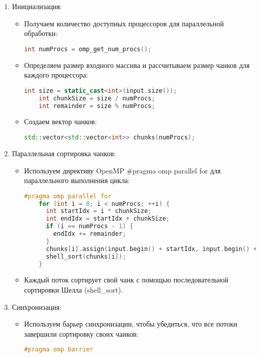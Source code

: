 \documentclass[]{article}
\theoremstyle{remark}
\theoremstyle{definition}
\newcommand{\cpp}{\textit{}}
\begin{document}
\begin{enumerate}
    \item Инициализация:
    \begin{itemize}
        \item Получаем количество доступных процессоров для параллельной обработки:
        \begin{lstlisting}[language=C++]
    int numProcs = omp_get_num_procs();
        \end{lstlisting}

        \item Определяем размер входного массива и рассчитываем размер чанков для каждого процессора:
        \begin{lstlisting}[language=C++]
    int size = static_cast<int>(input.size());
    int chunkSize = size / numProcs;
    int remainder = size % numProcs;
        \end{lstlisting}

        \item Создаем вектор чанков:
        \begin{lstlisting}[language=C++]
    std::vector<std::vector<int>> chunks(numProcs);
        \end{lstlisting}
    \end{itemize}

    \item Параллельная сортировка чанков:
    \begin{itemize}
        \item Используем директиву OpenMP \cpp{\#pragma omp parallel for} для параллельного выполнения цикла:
        \begin{lstlisting}[language=C++]
    #pragma omp parallel for
    for (int i = 0; i < numProcs; ++i) {
      int startIdx = i * chunkSize;
      int endIdx = startIdx + chunkSize;
      if (i == numProcs - 1) {
        endIdx += remainder;
      }
      chunks[i].assign(input.begin() + startIdx, input.begin() + endIdx);
      shell_sort(chunks[i]);
    }
        \end{lstlisting}
        
        \item Каждый поток сортирует свой чанк с помощью последовательной сортировки Шелла (\cpp{shell\_sort}).
    \end{itemize}
    \item Синхронизация:
    \begin{itemize}
        \item Используем барьер синхронизации, чтобы убедиться, что все потоки завершили сортировку своих чанков:
        \begin{lstlisting}[language=C++]
    #pragma omp barrier
        \end{lstlisting}
    \end{itemize}
    

\end{enumerate}
\end{document}
